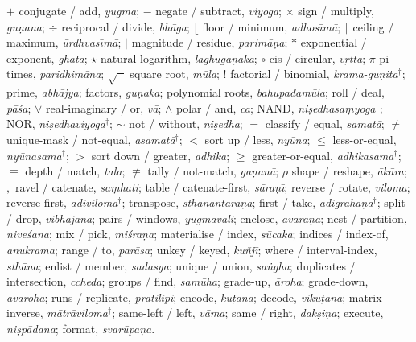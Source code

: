 \documentclass[manuscript, review, anonymous]{acmart}
\begin{document}
$+$ conjugate / add, \textit{yugma};
$-$ negate / subtract, \textit{viyoga};
$\times$ sign / multiply, \textit{gu{\d{n}}ana};
$\div$ reciprocal / divide, \textit{bh{\=a}ga};
$\lfloor$ floor / minimum, \textit{adhos{\=\i}m{\=a}};
$\lceil$ ceiling / maximum, \textit{{\=u}rdhvas{\=\i}m{\=a}};
$\mid$ magnitude / residue, \textit{parim{\=a}{\d{n}}a};
$*$ exponential / exponent, \textit{gh{\=a}ta};
$\star$ natural logarithm, \textit{laghuga{\d{n}}aka};
$\circ$ cis / circular, \textit{v{\d{r}}tta};
$\pi$ pi-times, \textit{paridhim{\=a}na};
$\sqrt{\phantom{x}}$ square root, \textit{m{\=u}la};
$!$ factorial / binomial, \textit{krama-gu{\d{n}}ita}$^\dagger$;
prime, \textit{abh{\=a}jya};
factors, \textit{gu{\d{n}}aka};
polynomial roots, \textit{bahupadam{\=u}la};
roll / deal, \textit{p{\=a}{\'s}a};
$\vee$ real-imaginary / or, \textit{v{\=a}};
$\wedge$ polar / and, \textit{ca};
NAND, \textit{ni{\d{s}}edhasa{\d{m}}yoga}$^\dagger$;
NOR, \textit{ni{\d{s}}edhaviyoga}$^\dagger$;
$\sim$ not / without, \textit{ni{\d{s}}edha};
$=$ classify / equal, \textit{samat{\=a}};
$\neq$ unique-mask / not-equal, \textit{asamat{\=a}}$^\dagger$;
$<$ sort up / less, \textit{ny{\=u}na};
$\leq$ less-or-equal, \textit{ny{\=u}nasama}$^\dagger$;
$>$ sort down / greater, \textit{adhika};
$\geq$ greater-or-equal, \textit{adhikasama}$^\dagger$;
$\equiv$ depth / match, \textit{tala};
$\not\equiv$ tally / not-match, \textit{ga{\d{n}}an{\=a}};
$\rho$ shape / reshape, \textit{{\=a}k{\=a}ra};
$,$ ravel / catenate, \textit{sa{\d{m}}hati};
table / catenate-first, \textit{s{\=a}ra{\d{n}}{\=\i}};
reverse / rotate, \textit{viloma};
reverse-first, \textit{{\=a}diviloma}$^\dagger$;
transpose, \textit{sth{\=a}n{\=a}ntara{\d{n}}a};
first / take, \textit{{\=a}digraha{\d{n}}a}$^\dagger$;
split / drop, \textit{vibh{\=a}jana};
pairs / windows, \textit{yugm{\=a}vali};
enclose, \textit{{\=a}vara{\d{n}}a};
nest / partition, \textit{nive{\'s}ana};
mix / pick, \textit{mi{\'s}ra{\d{n}}a};
materialise / index, \textit{s{\=u}caka};
indices / index-of, \textit{anukrama};
range / to, \textit{par{\=a}sa};
unkey / keyed, \textit{ku{\~n}j{\=\i}};
where / interval-index, \textit{sth{\=a}na};
enlist / member, \textit{sadasya};
unique / union, \textit{sa{\.n}gha};
duplicates / intersection, \textit{ccheda};
groups / find, \textit{sam{\=u}ha};
grade-up, \textit{{\=a}roha};
grade-down, \textit{avaroha};
runs / replicate, \textit{pratilipi};
encode, \textit{k{\=u}{\d{t}}ana};
decode, \textit{vik{\=u}{\d{t}}ana};
matrix-inverse, \textit{m{\=a}tr{\=a}viloma}$^\dagger$;
same-left / left, \textit{v{\=a}ma};
same / right, \textit{dak{\d{s}}i{\d{n}}a};
execute, \textit{ni{\d{s}}p{\=a}dana};
format, \textit{svar{\=u}pa{\d{n}}a}.
\end{document}
